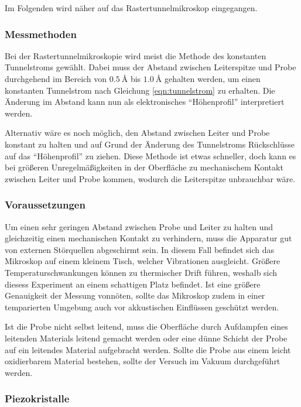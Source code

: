 Im Folgenden wird näher auf das Rastertunnelmikroskop eingegangen.

\subsubsection{Messmethoden} %
\label{ssub:messmethoden}

Bei der Rastertunnelmikroskopie wird meist die Methode des konstanten Tunnelstroms gewählt.
Dabei muss der Abstand zwischen Leiterspitze und Probe durchgehend im Bereich von $\SI{0,5}{\angstrom}$ bis $\SI{1,0}{\angstrom}$ gehalten werden, um einen konstanten Tunnelstrom nach Gleichung \ref{eqn:tunnelstrom} zu erhalten.
Die Änderung im Abstand kann nun als elektronisches "`Höhenprofil"' interpretiert werden.

Alternativ wäre es noch möglich, den Abstand zwischen Leiter und Probe konstant zu halten und auf Grund der Änderung des Tunnelstroms Rückschlüsse auf das "`Höhenprofil"' zu ziehen.
Diese Methode ist etwas schneller, doch kann es bei größeren Unregelmäßigkeiten in der Oberfläche zu mechanischem Kontakt zwischen Leiter und Probe kommen, wodurch die Leiterspitze unbrauchbar wäre.

\subsubsection{Voraussetzungen} %
\label{ssub:voraussetzungen}

Um einen sehr geringen Abstand zwischen Probe und Leiter zu halten und gleichzeitig einen mechanischen Kontakt zu verhindern, muss die Apparatur gut von externen Störquellen abgeschirmt sein.
In diesem Fall befindet sich das Mikroskop auf einem kleinem Tisch, welcher Vibrationen ausgleicht.
Größere Temperaturschwankungen können zu thermischer Drift führen, weshalb sich diesess Experiment an einem schattigen Platz befindet.
Ist eine größere Genauigkeit der Messung vonnöten, sollte das Mikroskop zudem in einer temparierten Umgebung auch vor akkustischen Einflüssen geschützt werden.

Ist die Probe nicht selbst leitend, muss die Oberfläche durch Aufdampfen eines leitenden Materials leitend gemacht werden oder eine dünne Schicht der Probe auf ein leitendes Material aufgebracht werden.
Sollte die Probe aus einem leicht oxidierbarem Material bestehen, sollte der Versuch im Vakuum durchgeführt werden.

\subsubsection{Piezokristalle} %
\label{ssub:piezokristalle}

